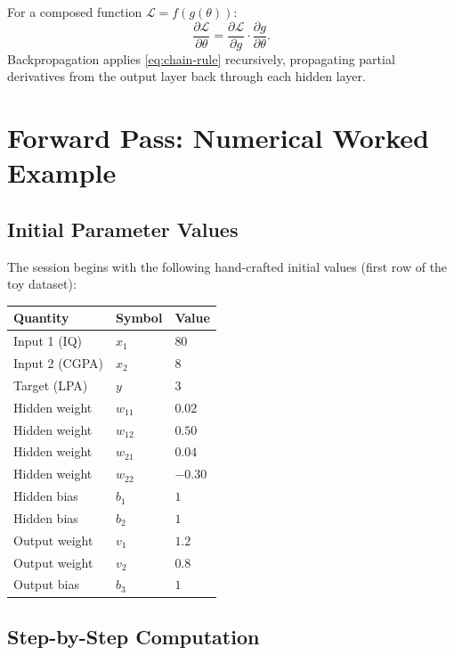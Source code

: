 \documentclass[12pt,a4paper]{article}
\newcommand{\Loss}{\mathcal{L}}
\newcommand{\pderiv}[2]{\dfrac{\partial #1}{\partial #2}}
\begin{document}
For a composed function $\Loss = f(g(\theta))$:
\begin{equation}
  \pderiv{\Loss}{\theta} = \pderiv{\Loss}{g} \cdot \pderiv{g}{\theta}.
  \label{eq:chain-rule}
\end{equation}
Backpropagation applies \cref{eq:chain-rule} recursively, propagating
partial derivatives from the output layer back through each hidden layer.

\section{Forward Pass: Numerical Worked Example}
\label{sec:forward}

\subsection{Initial Parameter Values}

The session begins with the following hand-crafted initial values
(first row of the toy dataset):

\begin{center}
\begin{tabular}{lll}
\toprule
\textbf{Quantity} & \textbf{Symbol} & \textbf{Value} \\
\midrule
Input 1 (IQ)    & $x_1$ & $80$ \\
Input 2 (CGPA)  & $x_2$ & $8$  \\
Target (LPA)    & $y$   & $3$  \\
\midrule
Hidden weight   & $w_{11}$ & $0.02$ \\
Hidden weight   & $w_{12}$ & $0.50$ \\
Hidden weight   & $w_{21}$ & $0.04$ \\
Hidden weight   & $w_{22}$ & $-0.30$ \\
Hidden bias     & $b_1$    & $1$ \\
Hidden bias     & $b_2$    & $1$ \\
Output weight   & $v_1$    & $1.2$ \\
Output weight   & $v_2$    & $0.8$ \\
Output bias     & $b_3$    & $1$ \\
\bottomrule
\end{tabular}
\end{center}

\subsection{Step-by-Step Computation}
\end{document}
